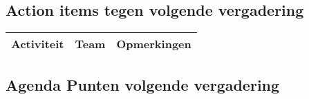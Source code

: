 \subsection{Action items tegen volgende vergadering}
\begin{table} [H]
	\centering
	\begin{tabular} {l|l|l}
		\textbf{Activiteit} & \textbf{Team} & \textbf{Opmerkingen} \\
		
		\hline
	\end{tabular}
\end{table}

\subsection{Agenda Punten volgende vergadering}



